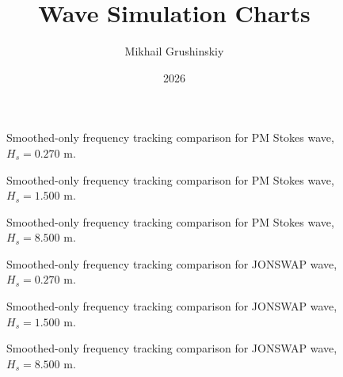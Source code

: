 \documentclass[11pt,letterpaper]{article}
\title{Wave Simulation Charts}
\author{Mikhail Grushinskiy}
\date{2026}
\begin{document}
    \maketitle




    \begin{figure}[H]\centering
    \resizebox{\textwidth}{!}{}
    \caption{Smoothed-only frequency tracking comparison for PM Stokes wave, $H_s = 0.270$ m.}
    \label{fig:freqtrack_pmstokes_low_smooth}
    \end{figure}

    \begin{figure}[H]\centering
    \resizebox{\textwidth}{!}{}
    \caption{Smoothed-only frequency tracking comparison for PM Stokes wave, $H_s = 1.500$ m.}
    \label{fig:freqtrack_pmstokes_medium_smooth}
    \end{figure}

    \begin{figure}[H]\centering
    \resizebox{\textwidth}{!}{}
    \caption{Smoothed-only frequency tracking comparison for PM Stokes wave, $H_s = 8.500$ m.}
    \label{fig:freqtrack_pmstokes_high_smooth}
    \end{figure}

    \begin{figure}[H]\centering
    \resizebox{\textwidth}{!}{}
    \caption{Smoothed-only frequency tracking comparison for JONSWAP wave, $H_s = 0.270$ m.}
    \label{fig:freqtrack_jonswap_low_smooth}
    \end{figure}

    \begin{figure}[H]\centering
    \resizebox{\textwidth}{!}{}
    \caption{Smoothed-only frequency tracking comparison for JONSWAP wave, $H_s = 1.500$ m.}
    \label{fig:freqtrack_jonswap_medium_smooth}
    \end{figure}

    \begin{figure}[H]\centering
    \resizebox{\textwidth}{!}{}
    \caption{Smoothed-only frequency tracking comparison for JONSWAP wave, $H_s = 8.500$ m.}
    \label{fig:freqtrack_jonswap_high_smooth}
    \end{figure}
\end{document}
